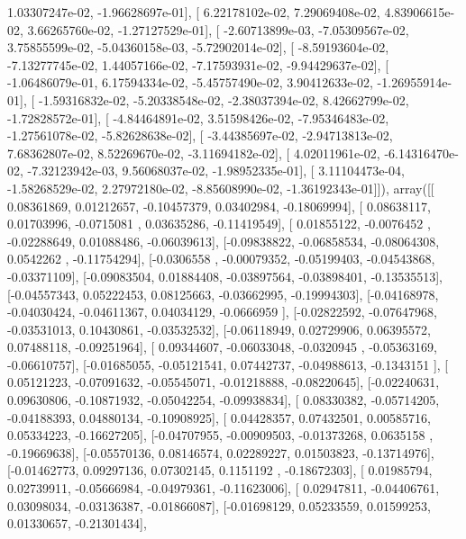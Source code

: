 \documentclass{article}
\begin{document}
          1.03307247e-02,  -1.96628697e-01],
       [  6.22178102e-02,   7.29069408e-02,   4.83906615e-02,
          3.66265760e-02,  -1.27127529e-01],
       [ -2.60713899e-03,  -7.05309567e-02,   3.75855599e-02,
         -5.04360158e-03,  -5.72902014e-02],
       [ -8.59193604e-02,  -7.13277745e-02,   1.44057166e-02,
         -7.17593931e-02,  -9.94429637e-02],
       [ -1.06486079e-01,   6.17594334e-02,  -5.45757490e-02,
          3.90412633e-02,  -1.26955914e-01],
       [ -1.59316832e-02,  -5.20338548e-02,  -2.38037394e-02,
          8.42662799e-02,  -1.72828572e-01],
       [ -4.84464891e-02,   3.51598426e-02,  -7.95346483e-02,
         -1.27561078e-02,  -5.82628638e-02],
       [ -3.44385697e-02,  -2.94713813e-02,   7.68362807e-02,
          8.52269670e-02,  -3.11694182e-02],
       [  4.02011961e-02,  -6.14316470e-02,  -7.32123942e-03,
          9.56068037e-02,  -1.98952335e-01],
       [  3.11104473e-04,  -1.58268529e-02,   2.27972180e-02,
         -8.85608990e-02,  -1.36192343e-01]]), array([[ 0.08361869,  0.01212657, -0.10457379,  0.03402984, -0.18069994],
       [ 0.08638117,  0.01703996, -0.0715081 ,  0.03635286, -0.11419549],
       [ 0.01855122, -0.0076452 , -0.02288649,  0.01088486, -0.06039613],
       [-0.09838822, -0.06858534, -0.08064308,  0.0542262 , -0.11754294],
       [-0.0306558 , -0.00079352, -0.05199403, -0.04543868, -0.03371109],
       [-0.09083504,  0.01884408, -0.03897564, -0.03898401, -0.13535513],
       [-0.04557343,  0.05222453,  0.08125663, -0.03662995, -0.19994303],
       [-0.04168978, -0.04030424, -0.04611367,  0.04034129, -0.0666959 ],
       [-0.02822592, -0.07647968, -0.03531013,  0.10430861, -0.03532532],
       [-0.06118949,  0.02729906,  0.06395572,  0.07488118, -0.09251964],
       [ 0.09344607, -0.06033048, -0.0320945 , -0.05363169, -0.06610757],
       [-0.01685055, -0.05121541,  0.07442737, -0.04988613, -0.1343151 ],
       [ 0.05121223, -0.07091632, -0.05545071, -0.01218888, -0.08220645],
       [-0.02240631,  0.09630806, -0.10871932, -0.05042254, -0.09938834],
       [ 0.08330382, -0.05714205, -0.04188393,  0.04880134, -0.10908925],
       [ 0.04428357,  0.07432501,  0.00585716,  0.05334223, -0.16627205],
       [-0.04707955, -0.00909503, -0.01373268,  0.0635158 , -0.19669638],
       [-0.05570136,  0.08146574,  0.02289227,  0.01503823, -0.13714976],
       [-0.01462773,  0.09297136,  0.07302145,  0.1151192 , -0.18672303],
       [ 0.01985794,  0.02739911, -0.05666984, -0.04979361, -0.11623006],
       [ 0.02947811, -0.04406761,  0.03098034, -0.03136387, -0.01866087],
       [-0.01698129,  0.05233559,  0.01599253,  0.01330657, -0.21301434],
\end{document}
